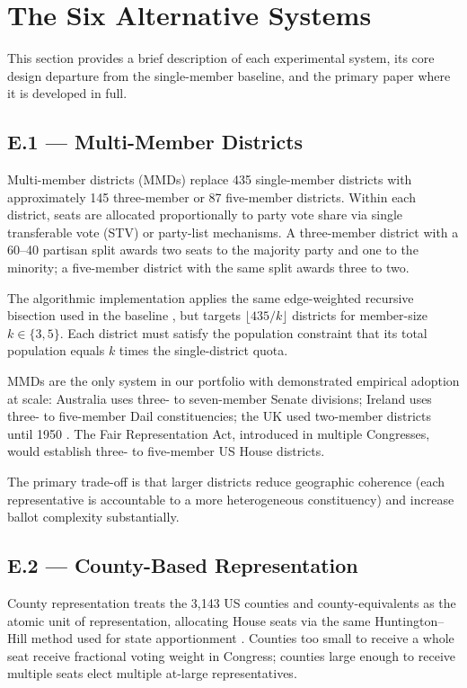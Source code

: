 \section{The Six Alternative Systems}
\label{sec:systems}

This section provides a brief description of each experimental system,
its core design departure from the single-member baseline, and the primary
paper where it is developed in full.

\subsection{E.1 --- Multi-Member Districts}

Multi-member districts (MMDs) replace 435 single-member districts with
approximately 145 three-member or 87 five-member districts.  Within each
district, seats are allocated proportionally to party vote share via
single transferable vote (STV) or party-list mechanisms.  A three-member
district with a 60--40 partisan split awards two seats to the majority party
and one to the minority; a five-member district with the same split awards
three to two.

The algorithmic implementation applies the same edge-weighted recursive
bisection used in the baseline \citep{dellaLibera2026dia}, but targets
$\lfloor 435/k \rfloor$ districts for member-size $k \in \{3, 5\}$.  Each
district must satisfy the population constraint that its total population
equals $k$ times the single-district quota.

MMDs are the only system in our portfolio with demonstrated empirical adoption
at scale: Australia uses three- to seven-member Senate divisions; Ireland uses
three- to five-member Dail constituencies; the UK used two-member districts
until 1950 \citep{farrell2011electoral}.  The Fair Representation Act, introduced
in multiple Congresses, would establish three- to five-member US House districts.

The primary trade-off is that larger districts reduce geographic coherence
(each representative is accountable to a more heterogeneous constituency) and
increase ballot complexity substantially.

\subsection{E.2 --- County-Based Representation}

County representation treats the 3,143 US counties and county-equivalents as
the atomic unit of representation, allocating House seats via the same
Huntington--Hill method used for state apportionment
\citep{balinski2001fair,huntington1921methods}.  Counties too small to
receive a whole seat receive fractional voting weight in Congress; counties
large enough to receive multiple seats elect multiple at-large representatives.

